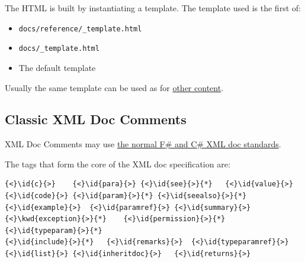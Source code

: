 \documentclass{article}
\newcommand{\id}[1]{\textcolor{black}{#1}}
\newcommand{\kwd}[1]{\textcolor{navy}{#1}}
\begin{document}
The HTML is built by instantiating a template. The template used is the first of:
\begin{itemize}
\item 

\texttt{docs/reference/\_template.html}

\item 

\texttt{docs/\_template.html}

\item 

The default template

\end{itemize}



Usually the same template can be used as for \href{content.html}{other content}.
\subsection*{Classic XML Doc Comments}



XML Doc Comments may use \href{https://docs.microsoft.com/en-us/dotnet/csharp/programming-guide/xmldoc/}{the normal F\# and C\# XML doc standards}.


The tags that form the core of the XML doc specification are:
\begin{Verbatim}[commandchars=\\\{\}]
{<}\id{c}{>}	{<}\id{para}{>}	{<}\id{see}{>}{*}	{<}\id{value}{>}
{<}\id{code}{>}	{<}\id{param}{>}{*}	{<}\id{seealso}{>}{*}
{<}\id{example}{>}	{<}\id{paramref}{>}	{<}\id{summary}{>}
{<}\kwd{exception}{>}{*}	{<}\id{permission}{>}{*}	{<}\id{typeparam}{>}{*}
{<}\id{include}{>}{*}	{<}\id{remarks}{>}	{<}\id{typeparamref}{>}
{<}\id{list}{>}	{<}\id{inheritdoc}{>}	{<}\id{returns}{>}

\end{Verbatim}
\end{document}
